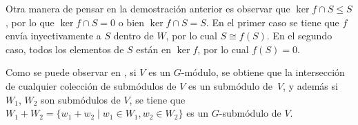 \documentclass[12pt]{book}
\newtheorem{theorem}{Teorema}[section]
\theoremstyle{definition}
\newtheorem{definition}[theorem]{Definición}
\newcounter{in}
\newcounter{ini}
\begin{document}
Otra manera de pensar en la demostración anterior es observar que
$\ker f\cap S\leq S$, por lo que $\ker f\cap S=0$ o bien $\ker f\cap
S=S$. En el primer caso se tiene que $f$ envía inyectivamente a $S$
dentro de $W$, por lo cual $S\cong f(S)$. En el segundo caso, todos
los elementos de $S$ están en $\ker f$, por lo cual $f(S)=0$.


Como se puede observar en \cite[p.~194]{herstein1990algebra}, si $V$ es un $G$-módulo, se obtiene que
la intersección de cualquier colección de submódulos de $V$ es un
submódulo de~$V$, y además si $W_{1}$, $W_{2}$ son submódulos de $V$,
se tiene que
$W_{1}+W_{2}=\{w_{1}+w_{2}\mid w_{1}\in W_{1}, w_{2}\in W_{2}\}$ es un
$G$-submódulo de $V$.




\end{document}
